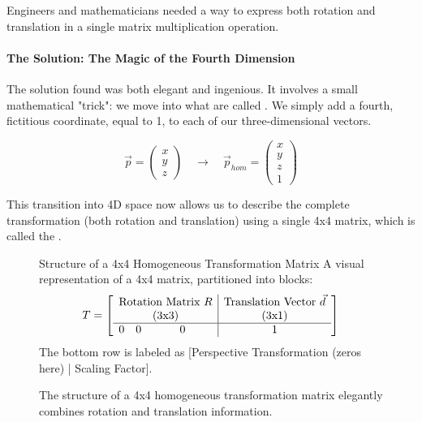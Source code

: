 Engineers and mathematicians needed a way to express both rotation and translation in a single matrix multiplication operation.

\paragraph{The Solution: The Magic of the Fourth Dimension}
The solution found was both elegant and ingenious. It involves a small mathematical "trick": we move into what are called . We simply add a fourth, fictitious coordinate, equal to 1, to each of our three-dimensional vectors.

$$ \vec{p} = \begin{pmatrix} x \\ y \\ z \end{pmatrix} \quad \rightarrow \quad \vec{p}_{hom} = \begin{pmatrix} x \\ y \\ z \\ 1 \end{pmatrix} $$

This transition into 4D space now allows us to describe the complete transformation (both rotation and translation) using a single 4x4 matrix, which is called the .

\begin{figure}[h!]
    \centering
    \begin{infobox}{Structure of a 4x4 Homogeneous Transformation Matrix}
        A visual representation of a 4x4 matrix, partitioned into blocks:
        \[
        T = \left[
        \begin{array}{ccc|c}
        \multicolumn{3}{c|}{\text{Rotation Matrix } R} & \text{Translation Vector } \vec{d} \\
        \multicolumn{3}{c|}{\text{(3x3)}} & \text{(3x1)} \\
        \hline
        0 & 0 & 0 & 1
        \end{array}
        \right]
        \]
        The bottom row is labeled as [Perspective Transformation (zeros here) | Scaling Factor].
    \end{infobox}
    \caption{The structure of a 4x4 homogeneous transformation matrix elegantly combines rotation and translation information.}
    \label{fig:homogeneous_matrix_structure}
\end{figure}


